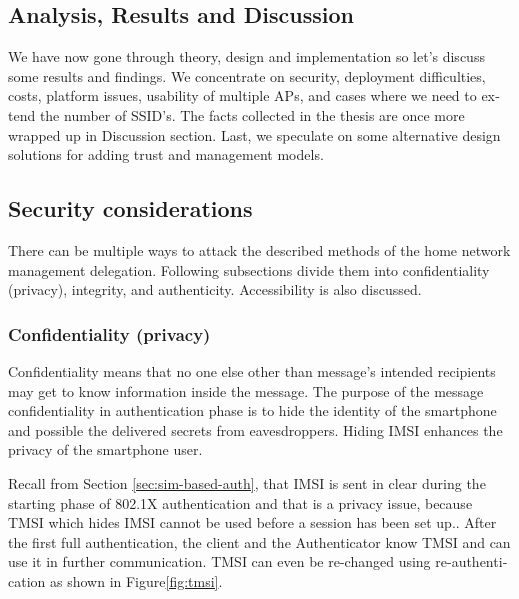 \documentclass[12pt,a4paper,english]{tutthesis}
\begin{document}
\begin{otherlanguage}{english}
\chapter{Analysis, Results and Discussion}
\label{sec-6}

We have now gone through theory, design and implementation so let's
discuss some results and findings. We concentrate on security, 
deployment difficulties, costs, platform issues, usability of multiple
APs, and cases where we
need to extend the number of SSID's. The facts collected in the thesis
are once more wrapped up in Discussion section.
Last, we speculate on some alternative design solutions for adding
trust and management models.


\section{Security considerations}
\label{sec-6-1}



There can be multiple ways to attack the described methods of
the home network management delegation. Following subsections divide them into
confidentiality (privacy), integrity, and
authenticity. Accessibility is also discussed.
\subsection{Confidentiality (privacy)}
\label{sec-6-1-1}

Confidentiality means that no one else other than message's intended
recipients may get to know information inside the message.
The purpose of the message confidentiality in authentication phase is
to hide the identity of the smartphone and possible the delivered
secrets from eavesdroppers. Hiding IMSI enhances the privacy of the smartphone user. 


Recall from Section \ref{sec:sim-based-auth}, that IMSI is sent in clear 
during the starting phase of 802.1X authentication and that is a privacy 
issue, because TMSI which hides IMSI cannot be used before a session
has been set up.\cite[p.66]{rfc4186}.
After the first full authentication, the client and the Authenticator 
know TMSI and can use it in further communication. 
TMSI can even be re-changed using re-authentication as shown in Figure\ref{fig:tmsi}.


\end{otherlanguage}
\end{document}
